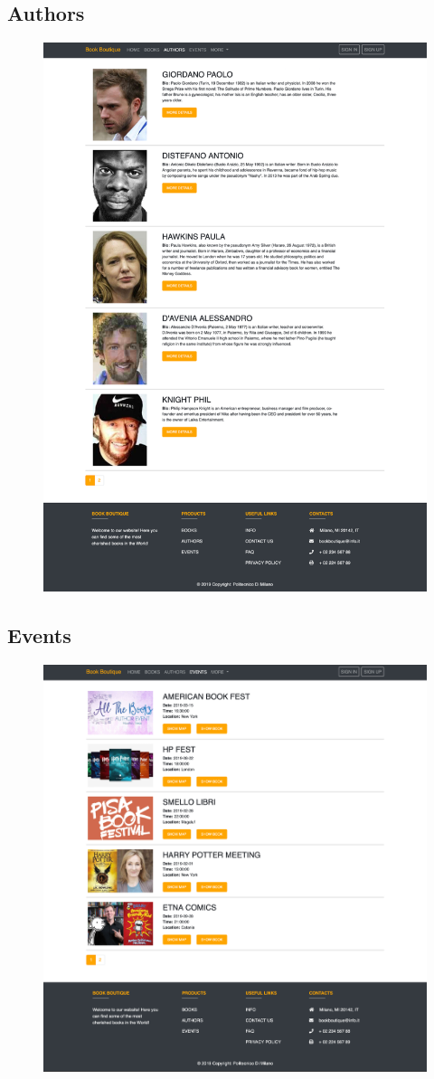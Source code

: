 \documentclass[12pt,a4paper]{article}
\begin{document}
\subsection{Authors}
\begin{figure}[h]
	\centering
	\includegraphics[width=0.8\linewidth]{provaaut}
	\label{fig:books}
\end{figure}
\newpage
\subsection{Events}
\begin{figure}[h]
	\centering
	\includegraphics[width=0.8\linewidth]{provaevents}
	\label{fig:books}
\end{figure}
\end{document}
